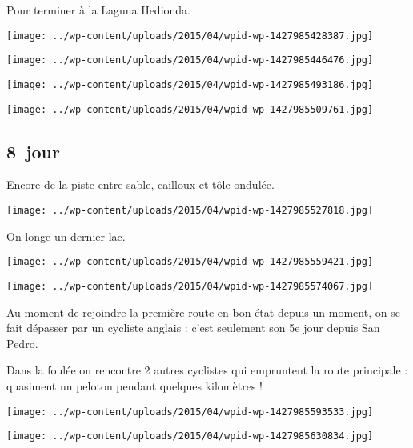  Pour terminer à la Laguna Hedionda.
\begin{center} \texttt{[image: ../wp-content/uploads/2015/04/wpid-wp-1427985428387.jpg]} \end{center}
\begin{center} \texttt{[image: ../wp-content/uploads/2015/04/wpid-wp-1427985446476.jpg]} \end{center}
\begin{center} \texttt{[image: ../wp-content/uploads/2015/04/wpid-wp-1427985493186.jpg]} \end{center}
\begin{center} \texttt{[image: ../wp-content/uploads/2015/04/wpid-wp-1427985509761.jpg]} \end{center}

 \subsection*{8\ieme\ jour} 

 Encore de la piste entre sable, cailloux et tôle ondulée.
\begin{center} \texttt{[image: ../wp-content/uploads/2015/04/wpid-wp-1427985527818.jpg]} \end{center}
\vspace{-\topsep}

\pagebreak
 On longe un dernier lac.
\begin{center} \texttt{[image: ../wp-content/uploads/2015/04/wpid-wp-1427985559421.jpg]} \end{center}
\begin{center} \texttt{[image: ../wp-content/uploads/2015/04/wpid-wp-1427985574067.jpg]} \end{center}

 Au moment de rejoindre la première route en bon état depuis un moment, on se fait dépasser par un cycliste anglais : c'est seulement son 5e jour depuis San Pedro. 

\pagebreak
 Dans la foulée on rencontre 2 autres cyclistes qui empruntent la route principale : quasiment un peloton pendant quelques kilomètres !
\begin{center} \texttt{[image: ../wp-content/uploads/2015/04/wpid-wp-1427985593533.jpg]} \end{center}
\begin{center} \texttt{[image: ../wp-content/uploads/2015/04/wpid-wp-1427985630834.jpg]} \end{center}
\vspace{-\topsep}
\vspace{-2.75mm}

